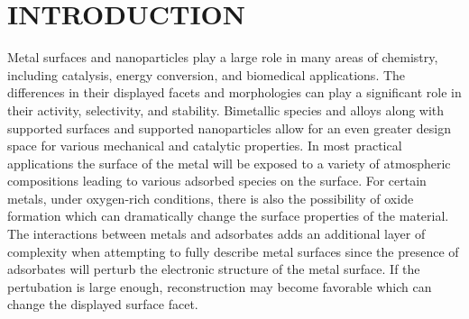 %

\chapter{INTRODUCTION}
Metal surfaces and nanoparticles play a large role in many areas of chemistry,
including catalysis,\citep{Clemens-Burda:2005qa, Sambur:2014mi} energy
conversion,\citep{Sneed:2014fj, Han:0qr} and biomedical
applications.\citep{Padmos:0qf, Nicklin:0ss} The differences in their displayed
facets and morphologies can play a significant role in their
activity,\citep{Chiu:2012ec, Stephens:2011bv} selectivity,\citep{Yi:0qq} and
stability.\citep{Zhang:2015ys, Zhang:2007uq} Bimetallic species and alloys
along with supported surfaces and supported nanoparticles allow for an even
greater design space for various mechanical\citep{Cao:2010gf, Huang:2012ul} and
catalytic properties.\citep{Han:0qr, Yu:2012by, Kim:2013mi, Jenness:2013oj}  In
most practical applications the surface of the metal will be exposed to a
variety of atmospheric compositions leading to various adsorbed species on the
surface.  For certain metals, under oxygen-rich conditions, there is also the
possibility of oxide formation which can dramatically change the surface
properties of the material.\citep{Streitz:1994mw, Derouin:2015kx} The
interactions between metals and adsorbates adds an additional layer of
complexity when attempting to fully describe metal surfaces since the presence
of adsorbates will perturb the electronic structure of the metal surface. If
the pertubation is large enough, reconstruction may become favorable which can
change the displayed surface facet.\citep{Tao:2010aa, Tao:2008aa, Kim:2013mi}

